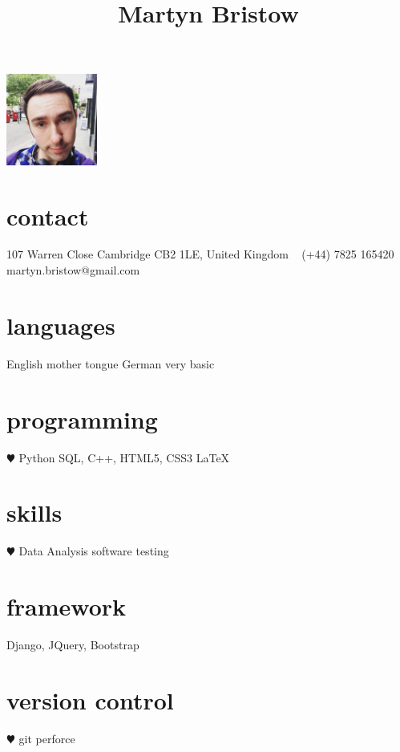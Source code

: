 \documentclass[]{cv-style}          %
\begin{document}
\lastupdated
\title{Martyn Bristow}

\begin{aside}
%
\includegraphics[width=3cm]{martyn.jpg}
\section{contact}
107 Warren Close
\hspace*{25pt} Cambridge
\hspace*{25pt} CB2 1LE, 
\hspace*{25pt} United Kingdom
~
(+44) 7825 165420
~
martyn.bristow@gmail.com
%
\section{languages}
English mother tongue
German very basic
%
\section{programming}
{\color{red} $\varheartsuit$} Python
SQL, C++,
HTML5, CSS3
\LaTeX{}
\section{skills}
{\color{red} $\varheartsuit$} Data Analysis
software testing
\section{framework}
Django, JQuery, Bootstrap
\section{version control}
{\color{red} $\varheartsuit$} git
perforce
%
\end{aside}
\faLinkedinSign
\end{document}
